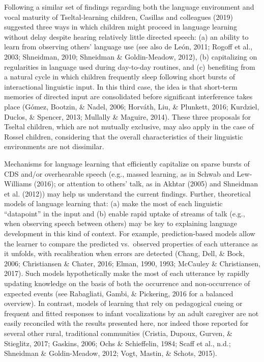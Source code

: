 \documentclass[
  english,
  ,man,floatsintext]{apa6}
\begin{document}
Following a similar set of findings regarding both the language environment and vocal maturity of Tseltal-learning children, Casillas and colleagues (2019) suggested three ways in which children might proceed in language learning without delay despite hearing relatively little directed speech: (a) an ability to learn from observing others' language use (see also de León, 2011; Rogoff et al., 2003; Shneidman, 2010; Shneidman \& Goldin-Meadow, 2012), (b) capitalizing on regularities in language used during day-to-day routines, and (c) benefiting from a natural cycle in which children frequently sleep following short bursts of interactional linguistic input. In this third case, the idea is that short-term memories of directed input are consolidated before significant interference takes place (Gómez, Bootzin, \& Nadel, 2006; Horváth, Liu, \& Plunkett, 2016; Kurdziel, Duclos, \& Spencer, 2013; Mullally \& Maguire, 2014). These three proposals for Tseltal children, which are not mutually exclusive, may also apply in the case of Rossel children, considering that the overall characteristics of their linguistic environments are not dissimilar.

Mechanisms for language learning that efficiently capitalize on sparse bursts of CDS and/or overhearable speech (e.g., massed learning, as in Schwab and Lew-Williams (2016); or attention to others' talk, as in Akhtar (2005) and Shneidman et al. (2012)) may help us understand the current findings. Further, theoretical models of language learning that: (a) make the most of each linguistic \enquote{datapoint} in the input and (b) enable rapid uptake of streams of talk (e.g., when observing speech between others) may be key to explaining language development in this kind of context. For example, prediction-based models allow the learner to compare the predicted vs.~observed properties of each utterance as it unfolds, with recalibration when errors are detected (Chang, Dell, \& Bock, 2006; Christiansen \& Chater, 2016; Elman, 1990, 1993; McCauley \& Christiansen, 2017). Such models hypothetically make the most of each utterance by rapidly updating knowledge on the basis of both the occurrence and non-occurrence of expected events (see Rabagliati, Gambi, \& Pickering, 2016 for a balanced overview). In contrast, models of learning that rely on pedagogical cueing or frequent and fitted responses to infant vocalizations by an adult caregiver are not easily reconciled with the results presented here, nor indeed those reported for several other rural, traditional communities (Cristia, Dupoux, Gurven, \& Stieglitz, 2017; Gaskins, 2006; Ochs \& Schieffelin, 1984; Scaff et al., n.d.; Shneidman \& Goldin-Meadow, 2012; Vogt, Mastin, \& Schots, 2015).
\end{document}
